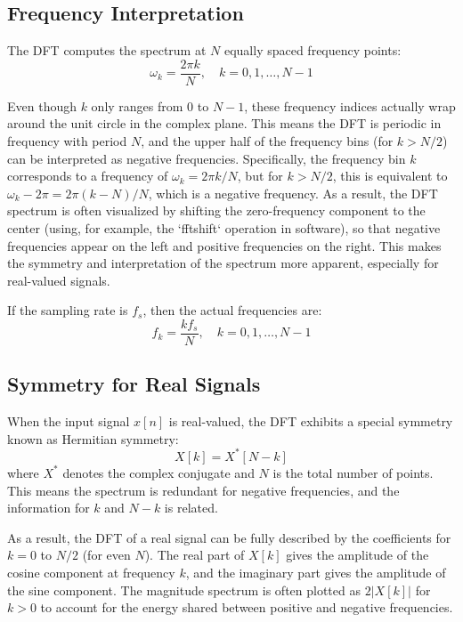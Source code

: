 \documentclass[11pt,a4paper]{article}
\begin{document}
\subsection{Frequency Interpretation}

The DFT computes the spectrum at $N$ equally spaced frequency points:
\begin{equation}
\omega_k = \frac{2\pi k}{N}, \quad k = 0, 1, \ldots, N-1
\end{equation}

Even though $k$ only ranges from $0$ to $N-1$, these frequency indices actually wrap around the unit circle in the complex plane. This means the DFT is periodic in frequency with period $N$, and the upper half of the frequency bins (for $k > N/2$) can be interpreted as negative frequencies. Specifically, the frequency bin $k$ corresponds to a frequency of $\omega_k = 2\pi k/N$, but for $k > N/2$, this is equivalent to $\omega_k - 2\pi = 2\pi (k-N)/N$, which is a negative frequency. As a result, the DFT spectrum is often visualized by shifting the zero-frequency component to the center (using, for example, the `fftshift` operation in software), so that negative frequencies appear on the left and positive frequencies on the right. This makes the symmetry and interpretation of the spectrum more apparent, especially for real-valued signals.

If the sampling rate is $f_s$, then the actual frequencies are:
\begin{equation}
f_k = \frac{k f_s}{N}, \quad k = 0, 1, \ldots, N-1
\end{equation}

\subsection{Symmetry for Real Signals}

When the input signal $x[n]$ is real-valued, the DFT exhibits a special symmetry known as Hermitian symmetry:
\begin{equation}
X[k] = X^*[N - k]
\end{equation}
where $X^*$ denotes the complex conjugate and $N$ is the total number of points. This means the spectrum is redundant for negative frequencies, and the information for $k$ and $N-k$ is related.

As a result, the DFT of a real signal can be fully described by the coefficients for $k = 0$ to $N/2$ (for even $N$). The real part of $X[k]$ gives the amplitude of the cosine component at frequency $k$, and the imaginary part gives the amplitude of the sine component. The magnitude spectrum is often plotted as $2|X[k]|$ for $k > 0$ to account for the energy shared between positive and negative frequencies.
\end{document}
